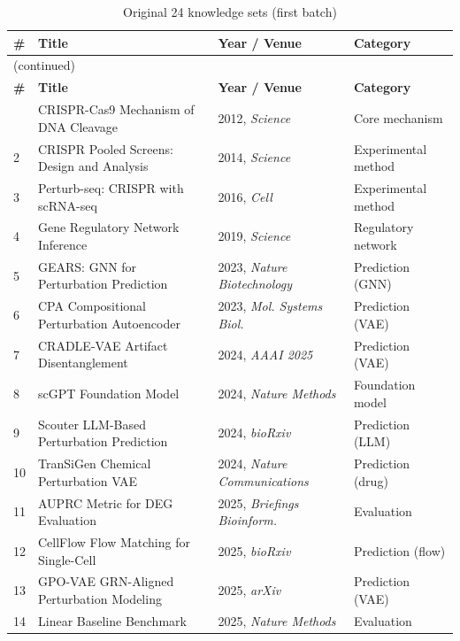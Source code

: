 \documentclass[12pt, a4paper]{article}
\begin{document}
\begin{longtable}{@{}p{0.5cm}p{5.4cm}p{3.2cm}p{3.6cm}@{}}
\caption{Original 24 knowledge sets (first batch)} \label{tab:kb1} \\
\toprule
\textbf{\#} & \textbf{Title} & \textbf{Year / Venue} & \textbf{Category} \\
\midrule
\endfirsthead
\multicolumn{4}{l}{\small(continued)} \\
\toprule
\textbf{\#} & \textbf{Title} & \textbf{Year / Venue} & \textbf{Category} \\
\midrule
\endhead
\bottomrule
\endfoot
1  & CRISPR-Cas9 Mechanism of DNA Cleavage        & 2012, \textit{Science}              & Core mechanism \\
2  & CRISPR Pooled Screens: Design and Analysis    & 2014, \textit{Science}              & Experimental method \\
3  & Perturb-seq: CRISPR with scRNA-seq            & 2016, \textit{Cell}                 & Experimental method \\
4  & Gene Regulatory Network Inference             & 2019, \textit{Science}              & Regulatory network \\
5  & GEARS: GNN for Perturbation Prediction        & 2023, \textit{Nature Biotechnology} & Prediction (GNN) \\
6  & CPA Compositional Perturbation Autoencoder    & 2023, \textit{Mol. Systems Biol.}   & Prediction (VAE) \\
7  & CRADLE-VAE Artifact Disentanglement           & 2024, \textit{AAAI 2025}            & Prediction (VAE) \\
8  & scGPT Foundation Model                        & 2024, \textit{Nature Methods}       & Foundation model \\
9  & Scouter LLM-Based Perturbation Prediction     & 2024, \textit{bioRxiv}              & Prediction (LLM) \\
10 & TranSiGen Chemical Perturbation VAE           & 2024, \textit{Nature Communications}& Prediction (drug) \\
11 & AUPRC Metric for DEG Evaluation               & 2025, \textit{Briefings Bioinform.} & Evaluation \\
12 & CellFlow Flow Matching for Single-Cell         & 2025, \textit{bioRxiv}              & Prediction (flow) \\
13 & GPO-VAE GRN-Aligned Perturbation Modeling     & 2025, \textit{arXiv}                & Prediction (VAE) \\
14 & Linear Baseline Benchmark                     & 2025, \textit{Nature Methods}       & Evaluation \\

\end{longtable}
\end{document}
